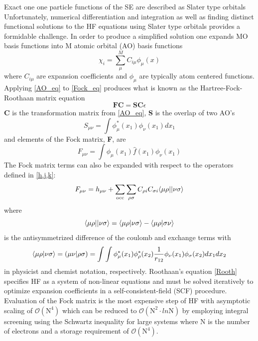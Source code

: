     Exact one one particle functions of the SE are described as  Slater type orbitals
    Unfortunately, numerical differentiation and integration as well as finding distinct functional solutions to the HF equations using Slater type orbitals provides a formidable challenge. In order to produce a simplified solution one expands MO basis functions into M atomic orbital (AO) basis functions
      \begin{equation} \label{AO_eq}
      \chi_i = \sum_\mu^M C_{i\mu} \phi_\mu(x)
      \end{equation}
    where $C_{i\mu}$ are expansion coefficients and $\phi_\mu$ are typically atom centered functions. Applying \cref{AO_eq} to \cref{Fock_eq} produces what is known as the Hartree-Fock-Roothaan matrix equation\cite{Roothaan1951,Roothaan1960}
      \begin{equation} \label{Rooth}
      \textbf{FC} = \textbf{SC}\epsilon
      \end{equation}
    \textbf{C} is the transformation matrix from \cref{AO_eq}, \textbf{S} is the overlap of two AO's
      \begin{equation}
      S_{\mu\nu} = \int \phi^*_\mu(x_1) \phi_\nu(x_1) dx_1
      \end{equation}
    and elements of the Fock matrix, \textbf{F}, are
      \begin{equation}
      F_{\mu\nu} = \int \phi_\mu(x_1) \hat{f}(x_1) \phi_\nu(x_1) 
      \end{equation}
    The Fock matrix terms can also be expanded with respect to the operators defined in \cref{h,j,k}:
      \begin{equation}
      F_{\mu\nu} = h_{\mu\nu} + \sum_{\text{occ}}\sum_{\rho \sigma} C_{\rho i} C_{\sigma i} \langle\mu \rho || \nu \sigma \rangle
      \end{equation}
    where 
      \begin{equation}
      \langle\mu \rho || \nu \sigma \rangle = \langle\mu \rho|\nu \sigma\rangle - \langle\mu \rho|\sigma \nu\rangle
      \end{equation}
    is the antisymmetrized difference of the coulomb and exchange terms with 
      \begin{equation} \label{antisymm}
      \langle\mu \rho|\nu \sigma\rangle = (\mu \nu | \rho \sigma) = \int \int \phi^*_\mu(x_1) \phi^*_\rho(x_2) \frac{1}{r_{12}} \phi_\nu (x_1) \phi_\sigma(x_2) dx_1 dx_2
      \end{equation}
    in physicist and chemist notation, respectively. Roothaan's equation \cref{Rooth} specifies HF as a system of non-linear equations and must be solved iteratively to optimize expansion coefficients in a self-consistent-field (SCF) procedure. Evaluation of the Fock matrix is the most expensive step of HF with asymptotic scaling of $\mathcal{O}(\text{N}^4)$ which can be reduced to $\mathcal{O}(\text{N}^2\cdot ln\text{N})$ by employing integral screening using the Schwartz inequality\cite{Strout1995} for large systems where N is the number of electrons and a storage requirement of $\mathcal{O}(\text{N}^4)$. 
